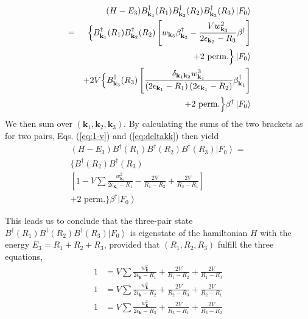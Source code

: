 \documentclass[aps,prb,superscriptaddress,showpacs,reprint,lengthcheck]{revtex4}
\begin{document}
\begin{eqnarray}  \label{eq:SchThree3}
&&(H-E _3)B^{\dagger}_{\mathbf{k} _1}(R_1)B^{\dagger}_{\mathbf{k}
_2}(R_2)B^{\dagger}_{\mathbf{k} _3}(R_3)\left|F_0\right>  \nonumber\\
&=& \Bigl\{B^{\dagger}_{\mathbf{k} _1}(R_1)B^{\dagger}_{\mathbf{k}
_2}(R_2)\left[w_{\mathbf{k} _3}\beta^{\dagger}_{\mathbf{k} _3}-\frac{Vw_{%
\mathbf{k} _3}^2}{2\epsilon_{\mathbf{k} _2}-R_3}\beta^{\dagger}\right] \nonumber\\
&&+\text{2 perm.} \Bigr\}\left|F_0\right> \nonumber\\
&&+2V\Bigl\{B^{\dagger}_{\mathbf{k} _3}(R_3)\left[\frac{\delta_{\mathbf{k} _1\mathbf{%
k} _2}w^3_{\mathbf{k} _1}}{\left(2\epsilon_{\mathbf{k} _1}-R_1\right)
\left(2\epsilon_{\mathbf{k} _1}-R_2\right) }\beta^{\dagger}_{\mathbf{k} _1}\right]\nonumber\\
&&\qquad+\text{2 perm.}\Bigr\} 
\beta^{\dagger}\left|F_0\right> 
\end{eqnarray}
We then sum over $\left(\mathbf{k} _1,\mathbf{k} _2,\mathbf{k} _3\right) $. By calculating the sums of the two brackets as for two pairs, Eqs. (\ref{eq:1-v}) and (\ref{eq:deltakk}) then yield
\begin{multline}  \label{eq:SchThree4}
(H-E _3)B^{\dagger}(R_1)B^{\dagger}(R_2)B^{\dagger}(R_3)\left|F_0%
\right>  = \\
\{B^{\dagger}(R_2)B^{\dagger}(R_3) \\
\left[1-V\sum\frac{w_{\mathbf{k} _1}^2}{2\epsilon_{\mathbf{k} _1}-R_1}-\frac{2V%
}{R_1-R_2}+\frac{2V}{R_3-R_1}\right]  \\
+\text{2 perm.}\}\beta^{\dagger}\left|F_0\right>  
\end{multline}

This leads us to  conclude that the three-pair state $%
B^{\dagger}(R_1)B^{\dagger}(R_2)B^{\dagger}(R_3)\left|F_0\right>  $ is
eigenstate of the hamiltonian $H$ with the energy $E _3=R_1+R_2+R_3$,
provided that $\left(R_1,R_2, R_3\right) $ fulfill the three equations, 
\begin{equation}
\begin{split}
1&=V\sum\frac{w_{\mathbf{k} }^2}{2\epsilon_{\mathbf{k} }-R_1}+\frac{2V}{R_1-R_2%
}+\frac{2V}{R_1-R_3} \\
1&=V\sum\frac{w_{\mathbf{k} }^2}{2\epsilon_{\mathbf{k} }-R_2}+\frac{2V}{R_2-R_3%
}+\frac{2V}{R_2-R_1} \\
1&=V\sum\frac{w_{\mathbf{k} }^2}{2\epsilon_{\mathbf{k} }-R_3}+\frac{2V}{R_3-R_1%
}+\frac{2V}{R_3-R_2}
\end{split}%
\end{equation}
\end{document}
